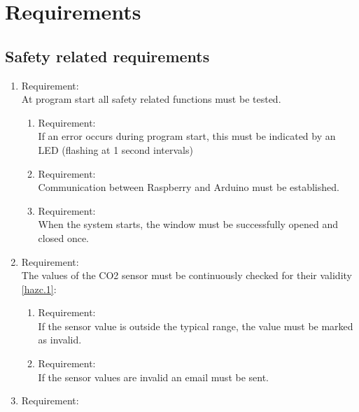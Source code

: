 \section{Requirements}
\label{chapter4}


\subsection{Safety related requirements}

	\begin{enumerate}[label*=\arabic*.]
		\item \label{req.1}  Requirement: \\
		At program start all safety related functions must be tested.  \\
		\begin{enumerate}[label*=\arabic*.]
			\item \label{req.1.1}  Requirement:  \\
			If an error occurs during program start, this must be indicated by an LED (flashing at 1 second intervals)\\ 
			\item \label{req.1.2} Requirement:   \\
			Communication between Raspberry and Arduino must be established.\\ 
			\item \label{req.1.3} Requirement:   \\
			When the system starts, the window must be successfully opened and closed once.\\    
		\end{enumerate}
		\item \label{req.2}  Requirement:  \\
         The values of the CO2 sensor must be continuously checked for their validity \ref{hazc.1}: \\
  	\begin{enumerate}[label*=\arabic*.]
			\item \label{req.2.1}  Requirement:  \\
			If the sensor value is outside the typical range, the value must be marked as invalid.\\ 
   		\item \label{req.2.2}  Requirement:  \\
			If the sensor values are invalid an email must be sent.\\
	  \end{enumerate}
		\item \label{req.3}  Requirement:  \\

\end{enumerate}
